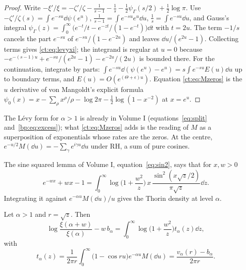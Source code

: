 \begin{proof}
Write $-\xi'/\xi=-\zeta'/\zeta-\frac1{s-1}-\frac1s-\frac12\psi_\Gamma(s/2)+\frac12\log\pi$. Use $-\zeta'/\zeta(s)=\int e^{-su}\dd\psi(e^u)$, $\frac1{s-1}=\int e^{-su}e^{u}\dd u$, $\frac1s=\int e^{-su}\dd u$, and Gauss's integral $\psi_\Gamma(z)=\int_0^\infty\big(e^{-t}/t-e^{-zt}/(1-e^{-t})\big)\dd t$ with $t=2u$. The term $-1/s$ cancels the part $e^{-su}$ of $e^{-su}/(1-e^{-2u})$ and leaves $\dd u/(e^{2u}-1)$. Collecting terms gives \eqref{ct:eq:levyxi}; the integrand is regular at $u=0$ because $-e^{-(s-1)u}+e^{-su}/(e^{2u}-1)-e^{-2u}/(2u)$ is bounded there. For the continuation, integrate by parts: $\int e^{-su}\dd(\psi(e^u)-e^u)=s\int e^{-su}E(u)\dd u$ up to boundary terms, and $E(u)=O(e^{(\Theta+\epsilon)u})$. Equation \eqref{ct:eq:Mzeros} is the $u$ derivative of von Mangoldt's explicit formula $\psi_0(x)=x-\sum_\rho x^\rho/\rho-\log2\pi-\frac12\log(1-x^{-2})$ at $x=e^u$.
\end{proof}

The L\'evy form for $\alpha>1$ is already in Volume I (equations~\eqref{eq:split} and~\eqref{bp:eq:excess}); what \eqref{ct:eq:Mzeros} adds is the reading of $M$ as a superposition of exponentials whose rates are the zeros. At the centre, $e^{-u/2}M(\dd u)=-\sum_\gamma e^{i\gamma u}\dd u$ under RH, a sum of pure cosines.

The sine squared lemma of Volume I, equation~\eqref{eq:sin2}, says that for $x,w>0$
\[
e^{-wx}+wx-1=\int_0^\infty\log\Big(1+\frac{w^2}{z}\Big)\,x\,\frac{\sin^2(x\sqrt z/2)}{\pi\sqrt z}\dd z.
\]
Integrating it against $e^{-\alpha u}M(\dd u)/u$ gives the Thorin density at level $\alpha$.

\begin{theorem}\label{ct:thm:dictionary}
Let $\alpha>1$ and $r=\sqrt z$. Then
\begin{equation}\label{ct:eq:thorinform}
\log\frac{\xi(\alpha+w)}{\xi(\alpha)}-w\,b_\alpha=\int_0^\infty\log\Big(1+\frac{w^2}{z}\Big)t_\alpha(z)\dd z,
\end{equation}
with
\begin{equation}\label{ct:eq:talpha}
t_\alpha(z)=\frac1{2\pi r}\int_0^\infty\big(1-\cos ru\big)e^{-\alpha u}M(\dd u)
=\frac{v_\alpha(r)-b_\alpha}{2\pi r}.
\end{equation}
\end{theorem}

